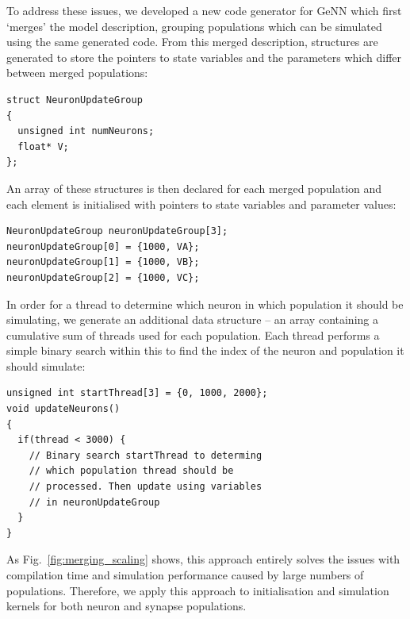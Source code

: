 \documentclass[9pt,twocolumn,twoside,lineno]{pnas-new}
\begin{document}
To address these issues, we developed a new code generator for GeNN which first `merges' the model description, grouping populations which can be simulated using the same generated code.
From this merged description, structures are generated to store the pointers to state variables and the parameters which differ between merged populations:
%
\begin{lstlisting}
struct NeuronUpdateGroup
{
  unsigned int numNeurons;
  float* V;  
};

\end{lstlisting}
%
An array of these structures is then declared for each merged population and each element is initialised with pointers to state variables and parameter values:
%
\begin{lstlisting}
NeuronUpdateGroup neuronUpdateGroup[3];
neuronUpdateGroup[0] = {1000, VA};
neuronUpdateGroup[1] = {1000, VB};
neuronUpdateGroup[2] = {1000, VC};
\end{lstlisting}
%
In order for a thread to determine which neuron in which population it should be simulating, we generate an additional data structure -- an array containing a cumulative sum of threads used for each population.
Each thread performs a simple binary search within this to find the index of the neuron and population it should simulate:
%
\begin{lstlisting}
unsigned int startThread[3] = {0, 1000, 2000};
void updateNeurons()
{
  if(thread < 3000) {
    // Binary search startThread to determing
    // which population thread should be 
    // processed. Then update using variables 
    // in neuronUpdateGroup
  }
}
\end{lstlisting}
%
As Fig.~\ref{fig:merging_scaling} shows, this approach entirely solves the issues with compilation time and simulation performance caused by large numbers of populations.
Therefore, we apply this approach to initialisation and simulation kernels for both neuron and synapse populations.
\end{document}
